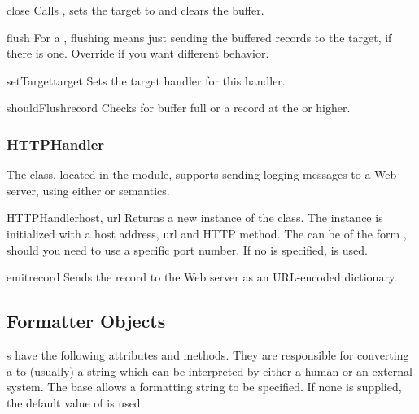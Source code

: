 \begin{methoddesc}{close}{}
Calls , sets the target to  and
clears the buffer.
\end{methoddesc}

\begin{methoddesc}{flush}{}
For a , flushing means just sending the buffered
records to the target, if there is one. Override if you want
different behavior.
\end{methoddesc}

\begin{methoddesc}{setTarget}{target}
Sets the target handler for this handler.
\end{methoddesc}

\begin{methoddesc}{shouldFlush}{record}
Checks for buffer full or a record at the  or higher.
\end{methoddesc}

\subsubsection{HTTPHandler}

The  class, located in the
 module, supports sending logging messages to
a Web server, using either  or  semantics.

\begin{classdesc}{HTTPHandler}{host, url}
Returns a new instance of the  class. The
instance is initialized with a host address, url and HTTP method.
The  can be of the form , should you need to
use a specific port number. If no  is specified, 
is used.
\end{classdesc}

\begin{methoddesc}{emit}{record}
Sends the record to the Web server as an URL-encoded dictionary.
\end{methoddesc}

\subsection{Formatter Objects}

s have the following attributes and methods. They are
responsible for converting a  to (usually) a string
which can be interpreted by either a human or an external system. The
base
 allows a formatting string to be specified. If none is
supplied, the default value of  is used.

